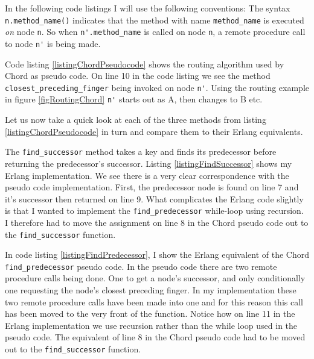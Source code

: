 In the following code listings I will use the following conventions:
The syntax \verb=n.method_name()= indicates that the method with name \verb=method_name= is executed \emph{on} node \verb=n=. So when \verb=n'.method_name= is called on node \verb=n=, a remote procedure call to node \verb=n'= is being made.

Code listing \ref{listingChordPseudocode} shows the routing algorithm used by Chord as pseudo code. On line 10 in the code listing we see the method \verb=closest_preceding_finger= being invoked on node \verb=n'=. Using the routing example in figure \ref{figRoutingChord} \verb=n'= starts out as A, then changes to B etc.



Let us now take a quick look at each of the three methods from listing \ref{listingChordPseudocode} in turn and compare them to their Erlang equivalents.

The \verb=find_successor= method takes a key and finds its predecessor before returning the predecessor's successor.
Listing \ref{listingFindSuccessor} shows my Erlang implementation.
We see there is a very clear correspondence with the pseudo code implementation. First, the predecessor node is found on line 7 and it's successor then returned on line 9.
What complicates the Erlang code slightly is that I wanted to implement the \verb=find_predecessor= while-loop using recursion. I therefore had to move the assignment on line 8 in the Chord pseudo code out to the \verb=find_successor= function.



In code listing \ref{listingFindPredecessor}, I show the Erlang equivalent of the Chord \verb=find_predecessor= pseudo code. 
In the pseudo code there are two remote procedure calls being done. One to get a node's successor, and only conditionally one requesting the node's closest preceding finger.
In my implementation these two remote procedure calls have been made into one and for this reason this call has been moved to the very front of the function.
Notice how on line 11 in the Erlang implementation we use recursion rather than the while loop used in the pseudo code. The equivalent of line 8 in the Chord pseudo code had to be moved out to the \verb=find_successor= function.



